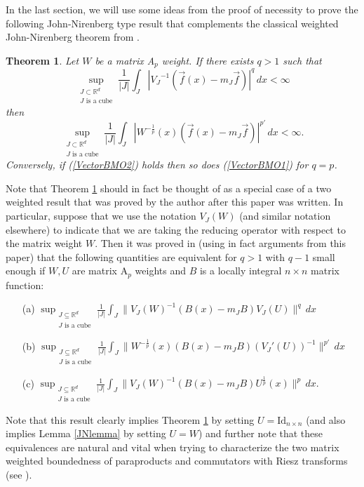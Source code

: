 \documentclass[12pt,reqno ]{amsart}
\numberwithin{equation}{section}
\newtheorem{theorem}{Theorem}[section]
\theoremstyle{definition}
\newcommand{\R}{\ensuremath{\mathbb{R}}}
\newcommand{\Rd}{\ensuremath{\mathbb{R}^d}}
\newcommand{\V}[1]{\ensuremath{\vec{#1}}}
\begin{document}
In the last section, we will use some ideas from the proof of necessity to prove the following John-Nirenberg type result that complements the classical weighted John-Nirenberg theorem from \cite{MW}.


\begin{theorem}  \label{MWMatrixThm}  Let $W$ be a matrix A${}_p$ weight.  If there exists $q > 1$ such that \begin{equation}  \label{VectorBMO1} \sup_{\substack{J \subset \R^d \\  J \text{ is a cube}}}  \frac{1}{|J|} \int_J |{V_J} ^{-1}  (\V{f} (x) - m_J \V{f})|^q \, dx < \infty \end{equation} then \begin{equation}  \label{VectorBMO2} \sup_{\substack{J \subset \R^d \\  J \text{ is a cube}}}  \frac{1}{|J|} \int_J |W^{-\frac{1}{p}}(x)   (\V{f} (x) - m_J \V{f})|^{p'} \, dx < \infty. \end{equation} Conversely, if (\ref{VectorBMO2}) holds then so does (\ref{VectorBMO1}) for $q = p$. \end{theorem}



Note that Theorem \ref{MWMatrixThm} should in fact be thought of as a special case of a two weighted result that was proved by the author after this paper was written.  In particular, suppose that we use the notation $V_J(W)$ (and similar notation elsewhere) to indicate that we are taking the reducing operator with respect to the matrix weight $W$.  Then it was proved in \cite{I1} (using in fact arguments from this paper) that the following quantities are equivalent for $q > 1$ with $q - 1$ small enough if $W, U$ are matrix A${}_p$ weights and $B$ is a locally integral $n \times n$ matrix function:
\begin{itemize}{}{}
\item [(a)] $\displaystyle \sup_{\substack{J \subseteq \Rd \\ J \text{ is a cube}} } \frac{1}{|J|} \int_J \|V_J(W)^{-1}  (B(x) - m_J B) V_J(U) \|^{q} \, dx $
\item [(b)] $\displaystyle \sup_{\substack{J \subseteq \Rd \\ J \text{ is a cube}} }   \frac{1}{|J|} \int_J \|W^{-\frac{1}{p}} (x) (B (x) - m_J B) (V_J ' (U))^{-1}  \|^{p'} \, dx $
\item[(c)] $\displaystyle  \sup_{\substack{J \subseteq \Rd \\ J \text{ is a cube}} }   \frac{1}{|J|} \int_J \| V_J(W) ^{-1} (B(x) - m_J B) U^\frac{1}{p} (x) \|^p \, dx. $
\end{itemize}
\noindent Note that this result clearly implies  Theorem \ref{MWMatrixThm} by setting $U = \text{Id}_{n \times n}$ (and also implies Lemma \ref{JNlemma} by setting $U = W$) and further note that these equivalences are natural and vital when trying to characterize the two matrix weighted boundedness of paraproducts and commutators with Riesz transforms (see \cite{I1}).
\end{document}

